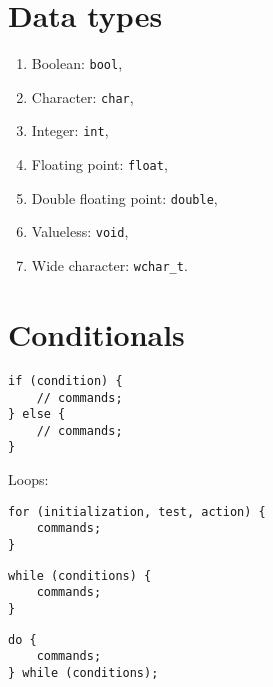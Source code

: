 \documentclass{programmingnotes}
\begin{document}
\renewcommand{\footrulewidth}{0.4pt}
\begin{multicols*}{3}

\section{Data types}
\begin{enumerate}
\item Boolean: \texttt{bool}, 
\item Character: \texttt{char}, 
\item Integer: \texttt{int}, 
\item Floating point: \texttt{float}, 
\item Double floating point: \texttt{double}, 
\item Valueless: \texttt{void}, 
\item Wide character: \texttt{wchar\_t}.
\end{enumerate}

\section{Conditionals}

\begin{verbatim}
if (condition) {
	// commands;
} else {
	// commands;
}
\end{verbatim}
Loops:

\begin{verbatim}
for (initialization, test, action) {
	commands;
}
\end{verbatim}

\begin{verbatim}
while (conditions) {
	commands;
}
\end{verbatim}

\begin{verbatim}
do {
	commands;
} while (conditions);
\end{verbatim}

\end{multicols*}
\end{document}

